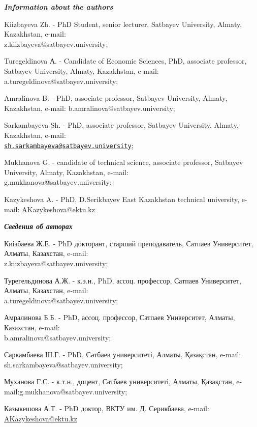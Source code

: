 \begin{authorinfo}
\emph{{\bfseries Information about the authors}}

Kiizbayeva Zh. - PhD Student, senior lecturer, Satbayev University,
Almaty, Kazakhstan, e-mail: \\z.kiizbayeva@satbayev.university;

Turegeldinova А. - Candidate of Economic Sciences, PhD, associate
professor, Satbayev University, Almaty, Kazakhstan, e-mail:
a.turegeldinova@satbayev.university;

Amralinova B. - PhD, associate professor, Satbayev University,
Almaty, Kazakhstan, e-mail: b.amralinova@satbayev.university;

Sarkambayeva Sh. - PhD, associate professor, Satbayev
University, Almaty, Kazakhstan, e-mail:\\
\href{mailto:sh.sarkambayeva@satbayev.university}{\nolinkurl{sh.sarkambayeva@satbayev.university}};

Mukhanova G. - candidate of technical science, associate
professor, Satbayev University, Almaty, Kazakhstan, e-mail:\\
g.mukhanova@satbayev.university;

Kazykeshova A. - PhD, D.Serikbayev East Kazakhstan technical university,
e-mail: \href{mailto:zh.serikbayeva@almau.edu.kz}{AKazykeshova@ektu.kz}

\emph{{\bfseries Сведения об авторах}}

Киізбаева Ж.Е. - PhD докторант, старший преподаватель, Сатпаев
Университет, Алматы, Казахстан, e-mail:\\
z.kiizbayeva@satbayev.university;

Турегельдинова А.Ж. - к.э.н., PhD, ассоц. профессор, Сатпаев
Университет, Алматы, Казахстан, e-mail:\\
a.turegeldinova@satbayev.university;

Амралинова Б.Б. - PhD, ассоц. профессор, Сатпаев Университет,
Алматы, Казахстан, e-mail: \\b.amralinova@satbayev.university;

Саркамбаева Ш.Г. - PhD, Сәтбаев университеті, Алматы, Қазақстан, e-mail:
sh.sarkambayeva@satbayev.university;

Муханова Г.С. - к.т.н., доцент, Сәтбаев университеті, Алматы, Қазақстан,
e-mail:g.mukhanova@satbayev.university;

Казыкешова А.Т. - PhD доктор, ВКТУ им. Д. Серикбаева, e-mail:
\href{mailto:zh.serikbayeva@almau.edu.kz}{AKazykeshova@ektu.kz}
\end{authorinfo}
